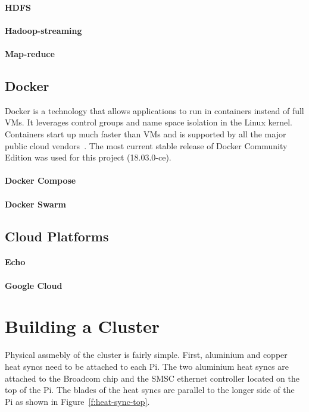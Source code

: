 \paragraph{HDFS}
\paragraph{Hadoop-streaming}
\paragraph{Map-reduce}


\subsection{Docker}
Docker is a technology that allows applications to run in containers
instead of full VMs. It leverages control groups and name space
isolation in the Linux kernel. Containers start up much faster than
VMs and is supported by all the major public cloud
vendors~\cite{Foster:2017:CCS:3158276}. The most current stable
release of Docker Community Edition was used for this project
(18.03.0-ce).
\paragraph{Docker Compose}
\paragraph{Docker Swarm}


\subsection{Cloud Platforms}
\paragraph{Echo}
\paragraph{Google Cloud}

\section{Building a Cluster}
  Physical assmebly of the cluster is fairly
simple. First, aluminium and copper heat syncs need to be attached to
each Pi. The two aluminium heat syncs are attached to the Broadcom
chip and the SMSC ethernet controller located on the top of the
Pi. The blades of the heat syncs are parallel to the longer side of
the Pi as shown in Figure~\ref{f:heat-sync-top}.

